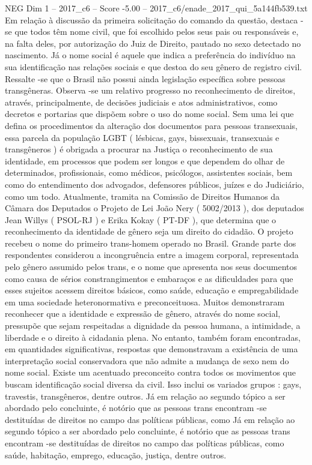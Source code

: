 \begin{textsample}{NEG Dim 1 – 2017\_c6 – Score -5.00 – 2017\_c6/enade\_2017\_qui\_5a144fb539.txt}
Em relação à discussão da primeira solicitação do comando da questão, destaca -se que todos têm nome civil, que foi escolhido pelos seus pais ou responsáveis e, na falta deles, por autorização do Juiz de Direito, pautado no sexo detectado no nascimento.
Já o nome social é aquele que indica a preferência do indivíduo na sua identificação nas relações sociais e que destoa do seu gênero de registro civil.
Ressalte -se que o Brasil não possui ainda legislação específica sobre pessoas transgêneras.
Observa -se um relativo progresso no reconhecimento de direitos, através, principalmente, de decisões judiciais e atos administrativos, como decretos e portarias que dispõem sobre o uso do nome social.
Sem uma lei que defina os procedimentos da alteração dos documentos para pessoas transexuais, essa parcela da população LGBT ( lésbicas, gays, bissexuais, transexuais e transgêneros ) é obrigada a procurar na Justiça o reconhecimento de sua identidade, em processos que podem ser longos e que dependem do olhar de determinados, profissionais, como médicos, psicólogos, assistentes sociais, bem como do entendimento dos advogados, defensores públicos, juízes e do Judiciário, como um todo.
Atualmente, tramita na Comissão de Direitos Humanos da Câmara dos Deputados o Projeto de Lei João Nery ( 5002/2013 ), dos deputados Jean Willys ( PSOL-RJ ) e Erika Kokay ( PT-DF ), que determina que o reconhecimento da identidade de gênero seja um direito do cidadão.
O projeto recebeu o nome do primeiro trans-homem operado no Brasil.
Grande parte dos respondentes considerou a incongruência entre a imagem corporal, representada pelo gênero assumido pelos trans, e o nome que apresenta nos seus documentos como causa de sérios constrangimentos e embaraços e as dificuldades para que esses sujeitos acessem direitos básicos, como saúde, educação e empregabilidade em uma sociedade heteronormativa e preconceituosa.
Muitos demonstraram reconhecer que a identidade e expressão de gênero, através do nome social, pressupõe que sejam respeitadas a dignidade da pessoa humana, a intimidade, a liberdade e o direito à cidadania plena.
No entanto, também foram encontradas, em quantidades significativas, respostas que demonstravam a existência de uma interpretação social conservadora que não admite a mudança de sexo nem do nome social.
Existe um acentuado preconceito contra todos os movimentos que buscam identificação social diversa da civil.
Isso inclui os variados grupos : gays, travestis, transgêneros, dentre outros.
Já em relação ao segundo tópico a ser abordado pelo concluinte, é notório que as pessoas trans encontram -se destituídas de direitos no campo das políticas públicas, como Já em relação ao segundo tópico a ser abordado pelo concluinte, é notório que as pessoas trans encontram -se destituídas de direitos no campo das políticas públicas, como saúde, habitação, emprego, educação, justiça, dentre outros.

\end{textsample}
